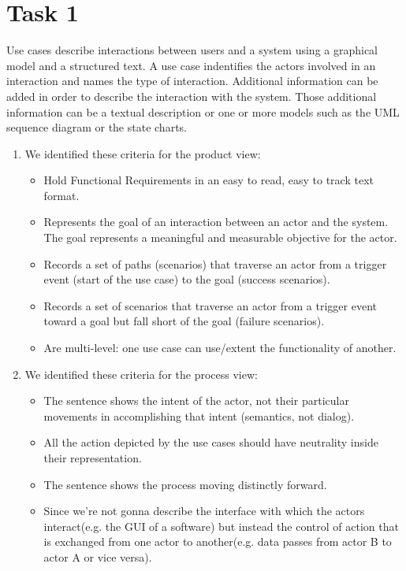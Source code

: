 \chapter{Task 1}
\begin{parlist}
	\item Use cases describe interactions between users and a system using a graphical model and a structured text. A use case indentifies the actors involved in an interaction and names the type of interaction. Additional information can be added in order to describe the interaction with the system. Those additional information can be a textual description or one or more models such as the UML sequence diagram or the state charts.
	\item 
		\begin{enumerate}
			\item We identified these criteria for the product view:
				\begin{itemize}
					\item Hold Functional Requirements in an easy to read, easy to track text format.
					\item Represents the goal of an interaction between an actor and the system. The goal represents a meaningful and measurable objective for the actor.
					\item Records a set of paths (scenarios) that traverse an actor from a trigger event (start of the use case) to the goal (success scenarios).
					\item Records a set of scenarios that traverse an actor from a trigger event toward a goal but fall short of the goal (failure scenarios).
					\item Are multi-level: one use case can use/extent the functionality of another. \cite{cockburnComingSoon}
				\end{itemize}
			\item We identified these criteria for the process view:	
				\begin{itemize}
					\item The sentence shows the intent of the actor, not their particular movements in accomplishing that intent (semantics, not dialog).\cite{cockburnComingSoon}
					\item All the action depicted by the use cases should have neutrality inside their representation. 
					\item The sentence shows the process moving distinctly forward. \cite{Adolph:2003aa}
					\item Since we're not gonna describe the interface with which the actors interact(e.g. the GUI of a software) but instead the control of action that is exchanged from one actor to another(e.g. data passes from actor B to actor A or vice versa).\cite{Sommerville:2004aa}

\end{itemize}
\end{enumerate}
\end{parlist}
